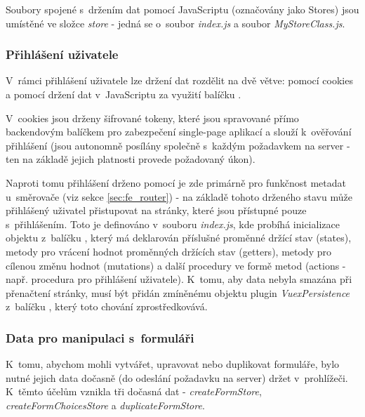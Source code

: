 	Soubory spojené s~držením dat pomocí JavaScriptu (označovány jako Stores) jsou umístěné ve složce \textit{store} - jedná se o~soubor \textit{index.js} a soubor \textit{MyStoreClass.js}.
	
		\subsubsection{Přihlášení uživatele}
		V~rámci přihlášení uživatele lze držení dat rozdělit na dvě větve: pomocí cookies a pomocí držení dat v~JavaScriptu za využití balíčku . 
		
		V~cookies jsou drženy šifrované tokeny, které jsou spravované přímo backendovým balíčkem pro zabezpečení single-page aplikací  a slouží k~ověřování přihlášení (jsou autonomně posílány společně s~každým požadavkem na server - ten na základě jejich platnosti provede požadovaný úkon). 
		
		Naproti tomu přihlášení drženo pomocí  je zde primárně pro funkčnost metadat u~směrovače (viz sekce \ref{sec:fe_router}) - na základě tohoto drženého stavu může přihlášený uživatel přistupovat na stránky, které jsou přístupné pouze s~přihlášením. Toto je definováno v~souboru \textit{index.js}, kde probíhá inicializace objektu z~balíčku , který má deklarován příslušné proměnné držící stav (states), metody pro vrácení hodnot proměnných držících stav (getters), metody pro cílenou změnu hodnot (mutations) a další procedury ve formě metod (actions - např. procedura pro přihlášení uživatele). K~tomu, aby data nebyla smazána při přenačtení stránky, musí být přidán zmíněnému objektu plugin \textit{VuexPersistence} z~balíčku , který toto chování zprostředkovává.
		
		\subsubsection{Data pro manipulaci s~formuláři}\label{sec:data_prohlizec_form}
		K~tomu, abychom mohli vytvářet, upravovat nebo duplikovat formuláře, bylo nutné jejich data dočasně (do odeslání požadavku na server) držet v~prohlížeči. K~těmto účelům vznikla tři dočasná  dat - \textit{createFormStore}, \textit{createFormChoicesStore} a \textit{duplicateFormStore}.
		
